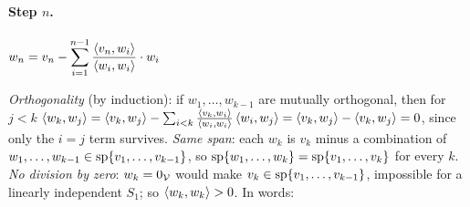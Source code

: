 \paragraph{Step $n$.} $\displaystyle w_n = v_n - \sum_{i=1}^{n-1}\frac{\left\langle v_n, w_i \right\rangle}{\left\langle w_i, w_i \right\rangle}\cdot w_i$
\begin{insight}
\emph{Orthogonality} (by induction): if $w_1,\ldots,w_{k-1}$ are mutually orthogonal, then for $j<k$
$\left\langle w_k, w_j \right\rangle = \left\langle v_k, w_j \right\rangle - \sum_{i<k}\frac{\left\langle v_k, w_i \right\rangle}{\left\langle w_i, w_i \right\rangle}\left\langle w_i, w_j \right\rangle = \left\langle v_k, w_j \right\rangle - \left\langle v_k, w_j \right\rangle = 0$,
since only the $i=j$ term survives.
\emph{Same span}: each $w_k$ is $v_k$ minus a combination of $w_1,\ldots,w_{k-1}\in\operatorname{sp}\{v_1,\ldots,v_{k-1}\}$, so $\operatorname{sp}\{w_1,\ldots,w_k\} = \operatorname{sp}\{v_1,\ldots,v_k\}$ for every $k$.
\emph{No division by zero}: $w_k = 0_{\mathcal{V}}$ would make $v_k\in\operatorname{sp}\{v_1,\ldots,v_{k-1}\}$, impossible for a linearly independent $S_1$; so $\left\langle w_k, w_k \right\rangle>0$.
In words: 
\end{insight}


